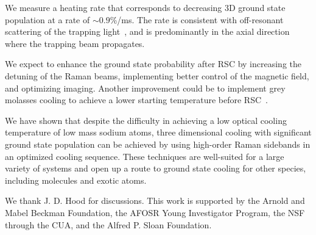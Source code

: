 \documentclass[aps,prl,twocolumn,groupedaddress]{revtex4-1}
\begin{document}
We measure a heating rate that corresponds to decreasing 3D ground state population
at a rate of $\sim0.9$\%/ms.
The rate is consistent with off-resonant scattering of the trapping light~\cite{Grimm2000},
and is predominantly in the axial direction where the trapping beam propagates.

We expect to enhance the ground state probability after RSC
by increasing the detuning of the Raman beams,
implementing better control of the magnetic field, and optimizing imaging.
Another improvement could be to implement grey molasses cooling to achieve
a lower starting temperature before RSC~\cite{Colzi2016}.

We have shown that despite the difficulty in achieving a low optical cooling temperature
of low mass sodium atoms, three dimensional cooling
with significant ground state population can be achieved by using high-order Raman sidebands
in an optimized cooling sequence.
These techniques are well-suited for a large variety of systems
and open up a route to ground state cooling for other species,
including molecules and exotic atoms.

We thank J. D. Hood for discussions.
This work is supported by the Arnold and Mabel Beckman Foundation, the AFOSR Young Investigator Program, the NSF through the CUA,
and the Alfred P. Sloan Foundation.


\end{document}
